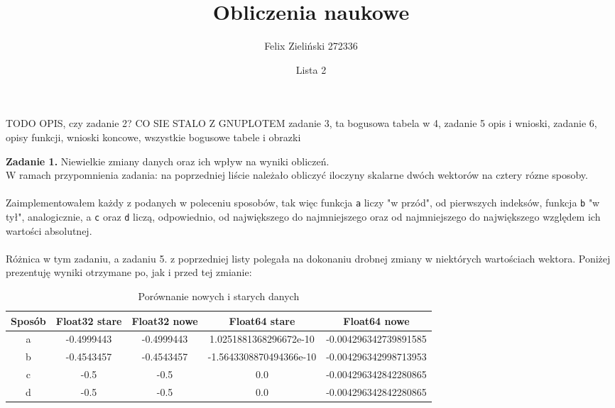 \documentclass[15pt, a4paper]{article}
\title{Obliczenia naukowe}
\author{Felix Zieliński 272336}
\date{Lista 2}
\begin{document}
\maketitle
TODO OPIS, czy zadanie 2? CO SIE STALO Z GNUPLOTEM zadanie 3, ta bogusowa tabela w 4, zadanie 5 opis i wnioski, zadanie 6, opisy funkcji, wnioski koncowe, wszystkie bogusowe tabele i obrazki

\vspace{0.5cm}

\noindent\hrulefill


\vspace{0.5cm}

\noindent\textbf{Zadanie 1.} Niewielkie zmiany danych oraz ich wpływ na wyniki obliczeń.\\

\noindent W ramach przypomnienia zadania: na poprzedniej liście  należało obliczyć iloczyny skalarne dwóch wektorów na cztery rózne sposoby.\\\\
Zaimplementowałem każdy z podanych w poleceniu sposobów, tak więc funkcja \verb|a| liczy "w przód", od pierwszych indeksów, funkcja \verb|b| "w tył", analogicznie, a \verb|c| oraz \verb|d| liczą, odpowiednio, od największego do najmniejszego oraz od najmniejszego do największego względem ich wartości absolutnej.\\\\
Różnica w tym zadaniu, a zadaniu 5. z poprzedniej listy polegała na dokonaniu drobnej zmiany w niektórych wartościach wektora. Poniżej prezentuję wyniki otrzymane po, jak i przed tej zmianie:


\begin{table}[ht]
    \begin{adjustbox}{max width=\textwidth}
    \begin{tabular}{|c|c|c|c|c|}
        \hline 
        Sposób & Float32 stare & Float32 nowe & Float64 stare & Float64 nowe \\ \hline
        a & -0.4999443 & -0.4999443 & 1.0251881368296672e-10 & -0.004296342739891585 \\ \hline
        b & -0.4543457 & -0.4543457 & -1.5643308870494366e-10 & -0.004296342998713953 \\ \hline
        c & -0.5 & -0.5 & 0.0 & -0.004296342842280865 \\ \hline
        d & -0.5 & -0.5 & 0.0 & -0.004296342842280865 \\ \hline
    \end{tabular}
    \end{adjustbox}
    \caption{Porównanie nowych i starych danych}
    \label{tab:products}
\end{table}
\end{document}
